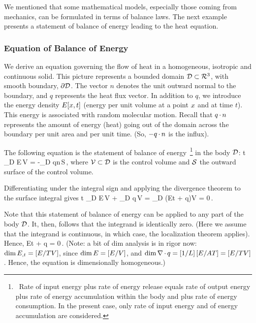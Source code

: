 We mentioned that some mathematical models, especially those coming from mechanics, can be formulated in terms of balance laws. The next example presents a statement of balance of energy leading to the heat equation.


\subsubsection{Equation of Balance of Energy}
We derive an equation governing the flow of heat in a homogeneous, isotropic and continuous solid. This picture represents a bounded domain $\mathcal{D}\subset\mathcal{R}^{3}$, with smooth boundary, $\partial\mathcal{D}$. The vector $n$ denotes the unit outward normal to the boundary, and $q$ represents the heat flux vector. In addition to $q$, we introduce the energy density $E\!\left[{x,t}\right]$ (energy per unit volume at a point $x$ and at time $t$). This energy is associated with random molecular motion. Recall that $q\operatorname{\cdot} n$ represents the amount of energy (heat) going out of the domain across the boundary per unit area and per unit time. (So, $-q\operatorname{\cdot} n$ is the influx).

The following equation is the statement of balance of energy~\footnote{~Rate of input energy plus rate of energy release equals rate of output energy plus rate of energy accumulation within the body and plus rate of energy consumption. In the present case, only rate of input energy and of energy accumulation are considered.} in the body $\mathcal{D}$:
\beq
\xod{}t \int_{\region D} E\,\dx\region V = -\int_{\bound\region D} q\iprod n\,\dx\region S\,,
\eeq
where $\mathcal{V}\subset\mathcal{D}$ is the control volume and $\mathcal{S}$ the outward surface of the control volume.

Differentiating under the integral sign and applying the divergence theorem to the surface integral gives
\beq
\xod{}t \int_{\region D} E\,\dx\region V + \int_{\region D} \gder\iprod q\,\dx\region V 
    = \int_{\region D} \left(\xpd Et + \gder\iprod q\right)\dx\region V
    = 0\,.
\eeq

Note that this statement of balance of energy can be applied to any part of the body $\mathcal{D}$. It, then, follows that the integrand is identically zero. (Here we assume that the integrand is continuous, in which case, the localization theorem applies). Hence,
\beq
\xpd Et + \gder\iprod q = 0\,.
\eeq
(Note: a bit of dim analysis is in rigor now: $\dim{E}_{,{t}} = \left[{E/TV}\right]$, since $\dim E = \left[{E/V}\right]$, and $\dim\nabla\operatorname{\cdot} q = \left[{1/L}\right]\left[{E/AT}\right] = \left[{E/TV}\right]$. Hence, the equation is dimensionally homogeneous.)

